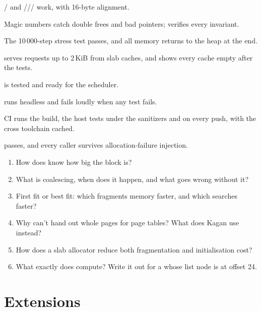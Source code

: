 \documentclass[11pt,a4paper]{article}
\begin{document}
\begin{milestonebox}
\begin{checklist}
  \item {}/ and /// work, with 16-byte alignment.
  \item Magic numbers catch double frees and bad pointers;  verifies every invariant.
  \item The 10\,000-step stress test passes, and all memory returns to the heap at the end.
  \item {} serves requests up to 2\,KiB from slab caches, and  shows every cache empty after the tests.
  \item {} is tested and ready for the scheduler.
  \item {} runs headless and fails loudly when any test fails.
  \item CI runs the  build, the host tests under the sanitizers and  on every push, with the cross toolchain cached.
  \item {} passes, and every caller survives allocation-failure injection.
\end{checklist}
\end{milestonebox}

\begin{questionbox}
\begin{enumerate}
  \item How does  know how big the block is?
  \item What is coalescing, when does it happen, and what goes wrong without it?
  \item First fit or best fit: which fragments memory faster, and which searches faster?
  \item Why can't  hand out whole pages for page tables? What does Kagan use instead?
  \item How does a slab allocator reduce both fragmentation and initialisation cost?
  \item What exactly does  compute? Write it out for a  whose list node is at offset 24.
\end{enumerate}
\end{questionbox}

\section{Extensions}
\end{document}
